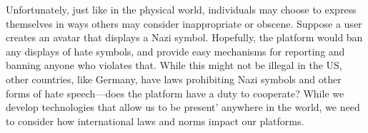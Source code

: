 Unfortunately, just like in the physical world, individuals may choose to express themselves in ways others may consider inappropriate or obscene. Suppose a user creates an avatar that displays a Nazi symbol. Hopefully, the platform would ban any displays of hate symbols, and provide easy mechanisms for reporting and banning anyone who violates that. While this might not be illegal in the US, other countries, like Germany, have laws prohibiting Nazi symbols and other forms of hate speech---does the platform have a duty to cooperate? While we develop technologies that allow us to be present' anywhere in the world, we need to consider how international laws and norms impact our platforms.


